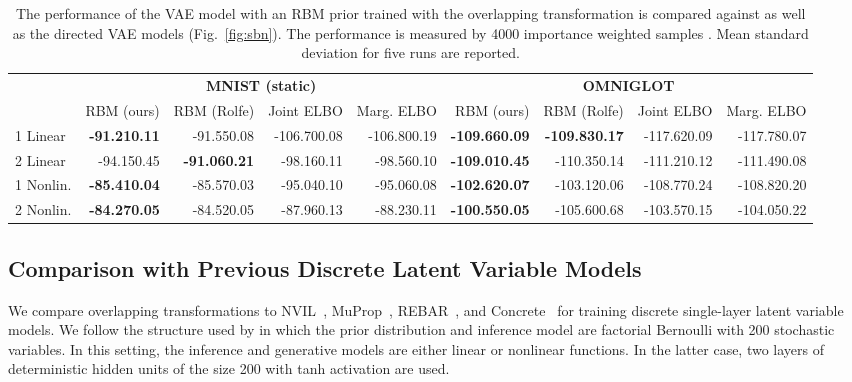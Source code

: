 \documentclass{article}
\begin{document}
\setlength{\tabcolsep}{3pt}   \begin{table*}
\caption{The performance of the VAE model with an RBM prior trained with the overlapping transformation 
is compared against \cite{rolfe2016discrete} as well as the directed VAE models (Fig.~\ref{fig:sbn}). 
The performance is measured by 4000 importance weighted samples \cite{burda2015importance}. Mean  standard deviation for five runs are reported.} \label{tab:res_rbm}
\footnotesize
\centering
\begin{tabular}{ l r r r r | r r r r}
\hline
\multicolumn{1}{c}{} & \multicolumn{4}{c|}{\textbf{MNIST (static)}} & \multicolumn{4}{c}{\textbf{OMNIGLOT}} \\
& RBM (ours) & RBM (Rolfe) & Joint ELBO & Marg. ELBO & RBM (ours) & RBM (Rolfe) & Joint ELBO & Marg. ELBO \\
\hline   
1 Linear    & \textbf{-91.210.11} & -91.550.08 & -106.700.08 &  -106.800.19 & \textbf{-109.660.09} & \textbf{-109.830.17} & -117.620.09 & -117.780.07 \\
2 Linear   & -94.150.45 & \textbf{-91.060.21} & -98.160.11  & -98.560.10 & \textbf{-109.010.45} & -110.350.14 & -111.210.12 & -111.490.08 \\
\hline 
1 Nonlin.    & \textbf{-85.410.04} & -85.570.03 & -95.040.10  & -95.060.08 & \textbf{-102.620.07} & -103.120.06 & -108.770.24 & -108.820.20 \\
2 Nonlin.   & \textbf{-84.270.05} & -84.520.05 & -87.960.13  & -88.230.11 & \textbf{-100.550.05} & -105.600.68 & -103.570.15 & -104.050.22 \\
\hline
\end{tabular}
\end{table*}

\subsection{Comparison with Previous Discrete Latent Variable Models} \label{sec:prev_comp}

We compare overlapping transformations to NVIL~\cite{mnih2014neural}, MuProp~\cite{gu2015muprop}, REBAR~\cite{tucker2017rebar}, and Concrete~\cite{maddison2016concrete} for training discrete single-layer latent variable models. 
We follow the structure used by \cite{tucker2017rebar} in which
the prior distribution and inference model are factorial Bernoulli with 200 stochastic variables. In this setting,
the inference and generative models are either linear or nonlinear functions. In the latter case, two layers 
of deterministic hidden units of the size 200 with tanh activation are used.
\end{document}
